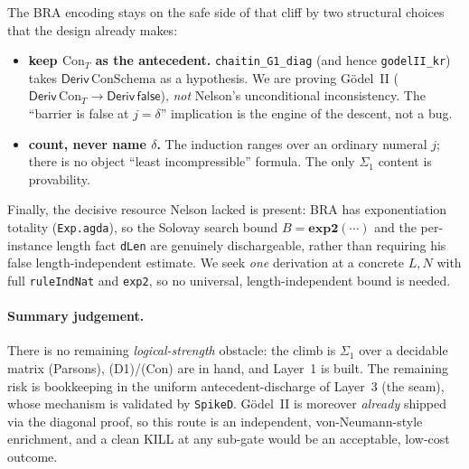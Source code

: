 \documentclass[11pt]{article}
\theoremstyle{plain}
\theoremstyle{definition}
\theoremstyle{remark}
\newcommand{\Deriv}{\mathsf{Deriv}}
\newcommand{\Con}{\mathrm{Con}_T}
\newcommand{\false}{\mathsf{false}}
\begin{document}
The BRA encoding stays on the safe side of that cliff by two structural choices
that the design already makes:
\begin{itemize}
\item \textbf{keep $\Con$ as the antecedent.} \texttt{chaitin\_G1\_diag} (and hence
  \texttt{godelII\_kr}) takes $\Deriv\,\mathrm{ConSchema}$ as a hypothesis. We are
  proving G\"odel~II ($\Deriv\,\Con \to \Deriv\,\false$), \emph{not} Nelson's
  unconditional inconsistency. The ``barrier is false at $j=\delta$'' implication
  is the engine of the descent, not a bug.
\item \textbf{count, never name $\delta$.} The induction ranges over an ordinary
  numeral $j$; there is no object ``least incompressible'' formula. The only
  $\Sigma_1$ content is provability.
\end{itemize}
Finally, the decisive resource Nelson lacked is present: BRA has exponentiation
totality (\texttt{Exp.agda}), so the Solovay search bound $B=\mathbf{exp2}(\cdots)$
and the per-instance length fact \texttt{dLen} are genuinely dischargeable, rather
than requiring his false length-independent estimate. We seek \emph{one}
derivation at a concrete $L,N$ with full \texttt{ruleIndNat} and \texttt{exp2}, so
no universal, length-independent bound is needed.

\paragraph{Summary judgement.} There is no remaining \emph{logical-strength}
obstacle: the climb is $\Sigma_1$ over a decidable matrix (Parsons), (D1)/(Con)
are in hand, and Layer~1 is built. The remaining risk is bookkeeping in the
uniform antecedent-discharge of Layer~3 (the seam), whose mechanism is validated
by \texttt{SpikeD}. G\"odel~II is moreover \emph{already} shipped via the diagonal
proof, so this route is an independent, von-Neumann-style enrichment, and a clean
KILL at any sub-gate would be an acceptable, low-cost outcome.
\end{document}
